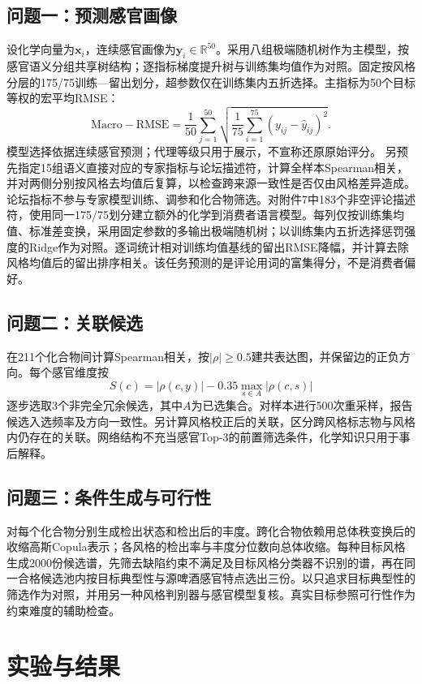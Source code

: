 \documentclass[UTF8,10pt,a4paper,fontset=fandol]{ctexart}
\begin{document}
\subsection{问题一：预测感官画像}
设化学向量为$\boldsymbol{x}_i$，连续感官画像为$\boldsymbol{y}_i\in\mathbb{R}^{50}$。采用八组极端随机树作为主模型，按感官语义分组共享树结构；逐指标梯度提升树与训练集均值作为对照。固定按风格分层的175/75训练—留出划分，超参数仅在训练集内五折选择。主指标为50个目标等权的宏平均RMSE：
\[
\mathrm{Macro\!-\!RMSE}=\frac1{50}\sum_{j=1}^{50}\sqrt{\frac1{75}\sum_{i=1}^{75}(y_{ij}-\hat y_{ij})^2}.
\]
模型选择依据连续感官预测；代理等级只用于展示，不宣称还原原始评分。
另预先指定15组语义直接对应的专家指标与论坛描述符，计算全样本Spearman相关，并对两侧分别按风格去均值后复算，以检查跨来源一致性是否仅由风格差异造成。论坛指标不参与专家模型训练、调参和化合物筛选。对附件7中183个非空评论描述符，使用同一175/75划分建立额外的化学到消费者语言模型。每列仅按训练集均值、标准差变换，采用固定参数的多输出极端随机树；以训练集内五折选择惩罚强度的Ridge作为对照。逐词统计相对训练均值基线的留出RMSE降幅，并计算去除风格均值后的留出排序相关。该任务预测的是评论用词的富集得分，不是消费者偏好。

\subsection{问题二：关联候选}
在211个化合物间计算Spearman相关，按$|\rho|\geq0.5$建共表达图，并保留边的正负方向。每个感官维度按
\[
S(c)=|\rho(c,y)|-0.35\max_{s\in A}|\rho(c,s)|
\]
逐步选取3个非完全冗余候选，其中$A$为已选集合。对样本进行500次重采样，报告候选入选频率及方向一致性。另计算风格校正后的关联，区分跨风格标志物与风格内仍存在的关联。网络结构不充当感官Top-3的前置筛选条件，化学知识只用于事后解释。

\subsection{问题三：条件生成与可行性}
对每个化合物分别生成检出状态和检出后的丰度。跨化合物依赖用总体秩变换后的收缩高斯Copula表示；各风格的检出率与丰度分位数向总体收缩。每种目标风格生成2000份候选谱，先筛去缺陷约束不满足及目标风格分类器不识别的谱，再在同一合格候选池内按目标典型性与源啤酒感官特点选出三份。以只追求目标典型性的筛选作为对照，并用另一种风格判别器与感官模型复核。真实目标参照可行性作为约束难度的辅助检查。

\section{实验与结果}
\end{document}

